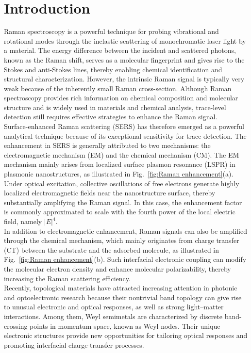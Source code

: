 \documentclass[journal]{IEEEtran}
\begin{document}
\section{Introduction}
\indent
Raman spectroscopy is a powerful technique for probing vibrational and rotational modes through the inelastic scattering of monochromatic laser light by a material. The energy difference between the incident and scattered photons, known as the Raman shift, serves as a molecular fingerprint and gives rise to the Stokes and anti-Stokes lines, thereby enabling chemical identification and structural characterization. However, the intrinsic Raman signal is typically very weak because of the inherently small Raman cross-section. Although Raman spectroscopy provides rich information on chemical composition and molecular structure and is widely used in materials and chemical analysis, trace-level detection still requires effective strategies to enhance the Raman signal\cite{doi:10.1021/acs.jpclett.9b01146}.\\
\indent
Surface-enhanced Raman scattering (SERS) has therefore emerged as a powerful analytical technique because of its exceptional sensitivity for trace detection\cite{doi:10.1021/acs.jpclett.5c01197}. The enhancement in SERS is generally attributed to two mechanisms: the electromagnetic mechanism (EM) and the chemical mechanism (CM)\cite{doi:10.1021/acs.jpclett.5c01197}. The EM mechanism mainly arises from localized surface plasmon resonance (LSPR) in plasmonic nanostructures, as illustrated in Fig.~\ref{fig:Raman enhancement}(a). Under optical excitation, collective oscillations of free electrons generate highly localized electromagnetic fields near the nanostructure surface, thereby substantially amplifying the Raman signal. In this case, the enhancement factor is commonly approximated to scale with the fourth power of the local electric field, namely $|E|^{4}$\cite{https://doi.org/10.1002/advs.202302568,Yi2016}.\\
\indent
In addition to electromagnetic enhancement, Raman signals can also be amplified through the chemical mechanism, which mainly originates from charge transfer (CT) between the substrate and the adsorbed molecule, as illustrated in Fig.~\ref{fig:Raman enhancement}(b). Such interfacial electronic coupling can modify the molecular electron density and enhance molecular polarizability, thereby increasing the Raman scattering efficiency\cite{CONG2020100051}.\\
\indent
Recently, topological materials have attracted increasing attention in photonic and optoelectronic research because their nontrivial band topology can give rise to unusual electronic and optical responses, as well as strong light--matter interactions. Among them, Weyl semimetals are characterized by discrete band-crossing points in momentum space, known as Weyl nodes\cite{Guo2023}. Their unique electronic structures provide new opportunities for tailoring optical responses and promoting interfacial charge-transfer processes.\\
\end{document}
